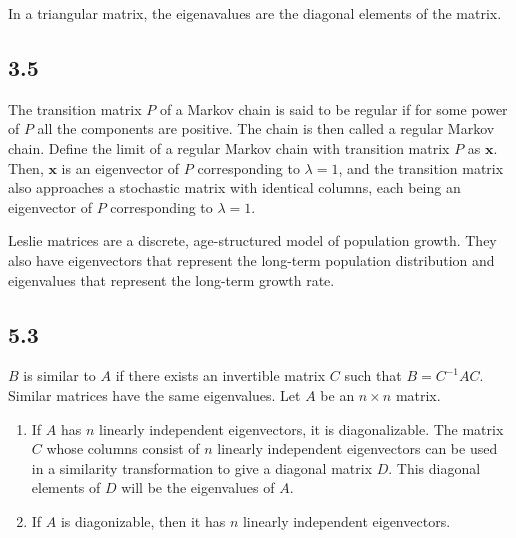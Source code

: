 \documentclass{article}
\begin{document}
    In a triangular matrix, the eigenavalues are the diagonal elements of the matrix.

    \subsection*{3.5}
    The transition matrix $P$ of a Markov chain is said to be regular if for some power of $P$ all the
    components are positive. 
    The chain is then called a regular Markov chain.
    Define the limit of a regular Markov chain with transition matrix $P$ as $\mathbf{x}$. 
    Then, $\mathbf{x}$ is an eigenvector of $P$ corresponding to $\lambda = 1$,
    and the transition matrix also approaches a stochastic matrix with identical columns,
    each being an eigenvector of $P$ corresponding to $\lambda = 1$.
    
    Leslie matrices are a discrete, age-structured model of population growth.
    They also have eigenvectors that represent the long-term population distribution
    and eigenvalues that represent the long-term growth rate.

    \subsection*{5.3}
    $B$ is similar to $A$ if there exists an invertible matrix $C$
    such that $B = C^{-1}AC$.
    Similar matrices have the same eigenvalues. 
    Let $A$ be an $n \times n$ matrix. 
    \begin{enumerate}
        \item If $A$ has $n$ linearly independent eigenvectors, it is diagonalizable.
        The matrix $C$ whose columns consist of $n$ linearly independent eigenvectors 
        can be used in a similarity transformation to give a diagonal matrix $D$. 
        This diagonal elements of $D$ will be the eigenvalues of $A$.
        \item If $A$ is diagonizable, then it has $n$ linearly independent eigenvectors.
    \end{enumerate}
\end{document}
